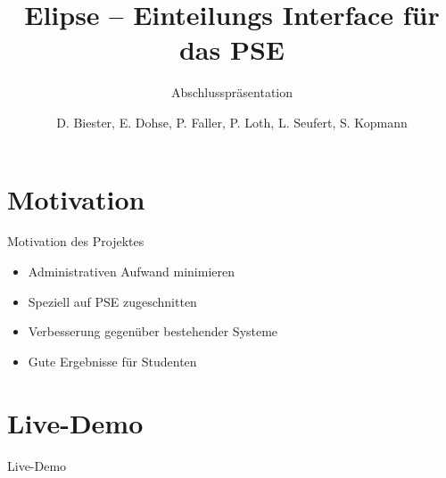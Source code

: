 \documentclass[18pt]{beamer}
\title[Elipse]{Elipse -- Einteilungs Interface für das PSE}
\subtitle{Abschlusspräsentation}
\author{D. Biester, E. Dohse, P. Faller, P. Loth, L. Seufert, S. Kopmann}
\institute{IPD Snelting}
\begin{document}

\begin{frame}
\titlepage
\end{frame}


\section{Motivation}
\begin{frame}{Motivation des Projektes}
\begin{itemize}
\item Administrativen Aufwand minimieren
\item Speziell auf PSE zugeschnitten
\item Verbesserung gegenüber bestehender Systeme
\item Gute Ergebnisse für Studenten

\end{itemize}
\end{frame}

\section{Live-Demo}
\begin{frame}
 \begin{center}
  \Huge Live-Demo
 \end{center}
\end{frame}
\end{document}
